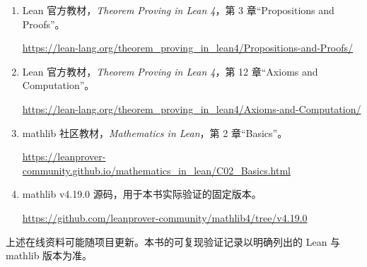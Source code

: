 \documentclass[UTF8,a4paper,zihao=-4,oneside,openany,fontset=fandol]{ctexbook}
\theoremstyle{definition}
\theoremstyle{remark}
\begin{document}
\begin{enumerate}[label=\arabic*.]
\item Lean 官方教材，\emph{Theorem Proving in Lean 4}，第 3 章“Propositions and Proofs”。\par
\url{https://lean-lang.org/theorem_proving_in_lean4/Propositions-and-Proofs/}
\item Lean 官方教材，\emph{Theorem Proving in Lean 4}，第 12 章“Axioms and Computation”。\par
\url{https://lean-lang.org/theorem_proving_in_lean4/Axioms-and-Computation/}
\item mathlib 社区教材，\emph{Mathematics in Lean}，第 2 章“Basics”。\par
\url{https://leanprover-community.github.io/mathematics_in_lean/C02_Basics.html}
\item mathlib v4.19.0 源码，用于本书实际验证的固定版本。\par
\url{https://github.com/leanprover-community/mathlib4/tree/v4.19.0}
\end{enumerate}

上述在线资料可能随项目更新。本书的可复现验证记录以明确列出的 Lean 与 mathlib 版本为准。
\end{document}
